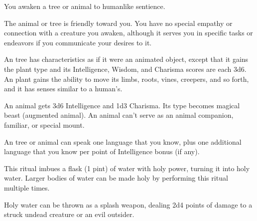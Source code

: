 \begin{spelleffect}
You awaken a tree or animal to humanlike sentience.
\par The  animal or tree is friendly toward you. You have no special empathy or connection with a creature you awaken, although it serves you in specific tasks or endeavors if you communicate your desires to it.
\par An  tree has characteristics as if it were an animated object, except that it gains the plant type and its Intelligence, Wisdom, and Charisma scores are each 3d6. An  plant gains the ability to move its limbs, roots, vines, creepers, and so forth, and it has senses similar to a human's.
\par An  animal gets 3d6 Intelligence and \plus1d3 Charisma. Its type becomes magical beast (augmented animal). An  animal can't serve as an animal companion, familiar, or special mount.
\par An  tree or animal can speak one language that you know, plus one additional language that you know per point of Intelligence bonus (if any).
\end{spelleffect}

\begin{spelleffect}
This ritual imbues a flask (1 pint) of water with holy power, turning it into holy water. Larger bodies of water can be made holy by performing this ritual multiple times.
\end{spelleffect}
\begin{spellnotes}
Holy water can be thrown as a splash weapon, dealing 2d4 points of damage to a struck undead creature or an evil outsider.
\end{spellnotes}

